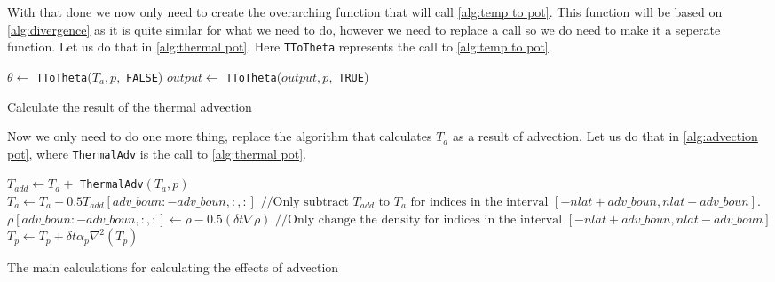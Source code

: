 With that done we now only need to create the overarching function that will call \autoref{alg:temp to pot}. This function will be based on \autoref{alg:divergence} as it is quite similar for 
what we need to do, however we need to replace a call so we do need to make it a seperate function. Let us do that in \autoref{alg:thermal pot}. Here \texttt{TToTheta} represents the call to 
\autoref{alg:temp to pot}.

\begin{algorithm}[!hbt]
    $\theta \leftarrow $ \texttt{TToTheta}($T_a, p,$ \texttt{FALSE}) \;
    $output \leftarrow $ \texttt{TToTheta}($output, p,$ \texttt{TRUE}) \;
     \;
    \caption{Calculate the result of the thermal advection}
    \label{alg:thermal pot}
\end{algorithm}

Now we only need to do one more thing, replace the algorithm that calculates $T_a$ as a result of advection. Let us do that in \autoref{alg:advection pot}, where \texttt{ThermalAdv} is the call 
to \autoref{alg:thermal pot}.

\begin{algorithm}
    $T_{add} \leftarrow T_a + $ \texttt{ThermalAdv}$(T_a, p)$\;
    $T_a \leftarrow T_a - 0.5T_{add}[adv\_boun:-adv\_boun, :, :] \text{ //Only subtract } T_{add} \text{ to } T_a \text{ for indices in the interval } [-nlat + adv\_boun, nlat - adv\_boun]$. \;
    $\rho[adv\_boun: -adv\_boun, :, :] \leftarrow \rho - 0.5(\delta t \nabla \rho) \text{ //Only change the density for indices in the interval } [-nlat + adv\_boun, nlat - adv\_boun]$ \;
    $T_p \leftarrow T_p + \delta t \alpha_p \nabla^2(T_p)$ \;
    \caption{The main calculations for calculating the effects of advection}
    \label{alg:advection pot}
\end{algorithm}